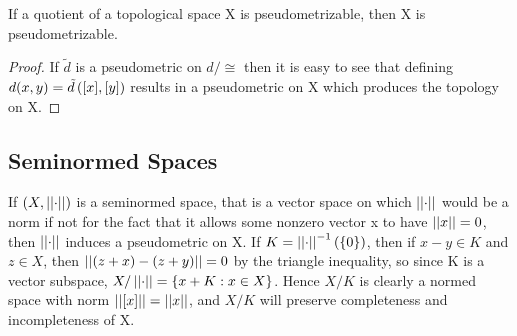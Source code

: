 














\begin{prop}
    \label{prop:pseudometrizableprequotient}
    If a quotient of a topological space X is pseudometrizable, then X is pseudometrizable.
    \begin{proof}
        If $\tilde{d}$ is a pseudometric on $d/\cong$ then it is easy to see that defining $d(x,y)=\tilde{d}\left( [x],[y]\right)$ results in a pseudometric on X which produces the topology on X. 
    \end{proof} 
\end{prop} 


\subsection{Seminormed Spaces}
If $(X,\left|\left| \cdot \right|\right|)$ is a seminormed space, that is a vector space on which $\left|\left| \cdot \right|\right|$ would be a norm if not for the fact that it allows some nonzero vector x to have $\left|\left| x \right|\right|=0$, then $\left|\left| \cdot \right|\right|$ induces a pseudometric on X. 
If $K=\left|\left| \cdot \right|\right|^{-1}(\{0\})$, then if $x-y \in K$ and $z \in X$, then $\left|\left| (z+x)-(z+y) \right|\right|=0$ by the triangle inequality, so since K is a vector subspace, $X/\left|\left| \cdot \right|\right|=\{x+K: x \in X\}$.
Hence $X/K$ is clearly a normed space with norm $\left|\left| [x] \right|\right| = \left|\left| x \right|\right|$, and $X/K$ will preserve completeness and incompleteness of X. 

